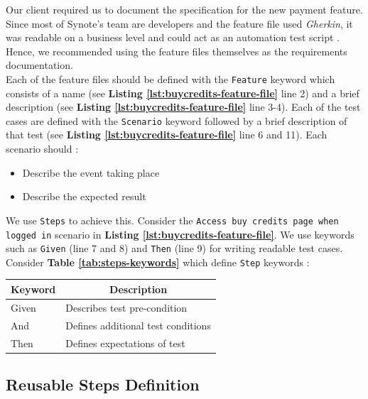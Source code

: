 Our client required us to document the specification for the new payment feature. Since most of Synote's team are developers and the feature file used \textit{Gherkin}, it was readable on a business level and could act as an automation test script \cite{featurefile1}. Hence, we recommended using the feature files themselves as the requirements documentation.\\

Each of the feature files should be defined with the \texttt{Feature} keyword which consists of a name  (see \textbf{Listing \ref{lst:buycredits-feature-file}} line  2) and a brief description  (see \textbf{Listing \ref{lst:buycredits-feature-file}} line  3-4). Each of the test cases are defined with the \texttt{Scenario} keyword followed by a brief description of that test (see \textbf{Listing \ref{lst:buycredits-feature-file}} line  6 and 11). Each scenario should \cite{featurefile3}:
\begin{itemize}
\item Describe the event taking place
\item Describe the expected result
\end{itemize}

We use \texttt{Steps} to achieve this. Consider the \texttt{Access buy credits page when logged in} scenario in \textbf{Listing \ref{lst:buycredits-feature-file}}. We use keywords such as \texttt{Given} (line 7 and 8) and \texttt{Then} (line 9) for writing readable test cases. Consider \textbf{Table \ref{tab:steps-keywords}} which define \texttt{Step} keywords \cite{featurefile1}:

\begin{center}
\begin{tabular}{ |p{2cm}|p{7cm}| }

 \hline
 	\multicolumn{1}{|c|}{Keyword} &
 	\multicolumn{1}{|c|}{Description}\\
 \hline
 	Given & Describes test pre-condition\\
 \hline
 	And & Defines additional test conditions\\
 \hline
 	Then & Defines expectations of test \\
 \hline

\end{tabular}
\label{tab:steps-keywords}
\end{center}

\vspace{-1cm}
\subsection{Reusable Steps Definition}
\label{subsec:reusable-steps-definition}

